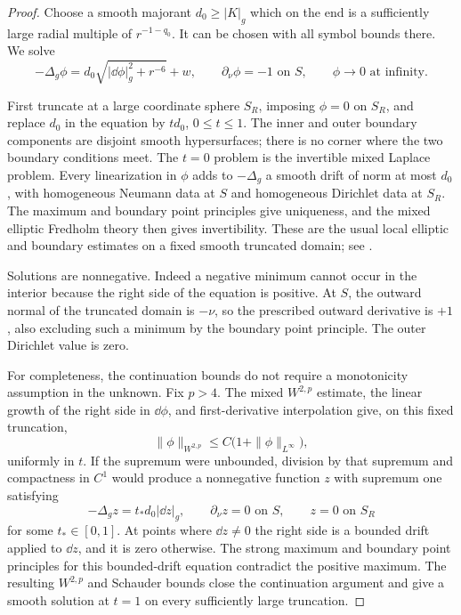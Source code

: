 \begin{proof}
Choose a smooth majorant $d_0\ge |K|_g$ which on the end is a sufficiently
large radial multiple of $r^{-1-q_0}$. It can be chosen with all symbol
bounds there. We solve
\begin{equation}
 -\Delta_g\phi
   =d_0\sqrt{|\dd\phi|_g^2+r^{-6}}+w,
 \qquad \partial_\nu\phi=-1\text{ on }S,
 \qquad \phi\longrightarrow0\text{ at infinity}.
\label{rig4:var:phi-equation}
\end{equation}

First truncate at a large coordinate sphere $S_R$, imposing $\phi=0$ on
$S_R$, and replace $d_0$ in the equation by $t d_0$, $0\le t\le1$.
The inner and outer boundary components are disjoint smooth hypersurfaces;
there is no corner where the two boundary conditions meet. The $t=0$
problem is the invertible mixed Laplace problem. Every linearization in
$\phi$ adds to $-\Delta_g$ a smooth drift of norm at most $d_0$, with
homogeneous Neumann data at $S$ and homogeneous Dirichlet data at $S_R$.
The maximum and boundary point principles give uniqueness, and the mixed
elliptic Fredholm theory then gives invertibility. These are the usual
local elliptic and boundary estimates on a fixed smooth truncated domain;
see \cite{GilbargTrudinger2001}.

Solutions are nonnegative. Indeed a negative minimum cannot occur in the
interior because the right side of the equation is positive. At $S$, the
outward normal of the truncated domain is $-\nu$, so the prescribed
outward derivative is $+1$, also excluding such a minimum by the boundary
point principle. The outer Dirichlet value is zero.

For completeness, the continuation bounds do not require a monotonicity
assumption in the unknown. Fix $p>4$. The mixed $W^{2,p}$ estimate, the
linear growth of the right side in $\dd\phi$, and first-derivative
interpolation give, on this fixed truncation,
\[
 \|\phi\|_{W^{2,p}}\le C\bigl(1+\|\phi\|_{L^\infty}\bigr),
\]
uniformly in $t$. If the supremum were unbounded, division by that
supremum and compactness in $C^1$ would produce a nonnegative function
$z$ with supremum one satisfying
\[
 -\Delta_g z=t_*d_0|\dd z|_g,
 \qquad \partial_\nu z=0\text{ on }S,
 \qquad z=0\text{ on }S_R
\]
for some $t_*\in[0,1]$. At points where $\dd z\ne0$ the right side is a
bounded drift applied to $\dd z$, and it is zero otherwise. The strong
maximum and boundary point principles for this bounded-drift equation
contradict the positive maximum. The resulting $W^{2,p}$ and Schauder
bounds close the continuation argument and give a smooth solution at
$t=1$ on every sufficiently large truncation.


\end{proof}
